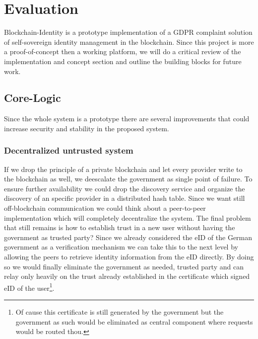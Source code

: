 \chapter{Evaluation}
\label{cha:evaluation}

Blockchain-Identity is a prototype implementation of a GDPR complaint solution of self-sovereign identity management in the blockchain. Since this project is more a proof-of-concept then a working platform, we will do a critical review of the implementation and concept section and outline the building blocks for future work.  

\section{Core-Logic}
\label{sec:coreLogicEval}
Since the whole system is a prototype there are several improvements that could increase security and stability in the proposed system. 

\subsection{Decentralized untrusted system}
\label{sec:untrustedSystem}
If we drop the principle of a private blockchain and let every provider write to the blockchain as well, we deescalate the government as single point of failure. To ensure further availability we could drop the discovery service and organize the discovery of an specific provider in a distributed hash table. Since we want still off-blockchain communication we could think about a peer-to-peer implementation which will completely decentralize the system. The final problem that still remains is how to establish trust in a new user without having the government as trusted party? Since we already considered the eID of the German government as a verification mechanism we can take this to the next level by allowing the peers to retrieve identity information from the eID directly. By doing so we would finally eliminate the government as needed, trusted party and can relay only heavily on the trust already established in the certificate which signed eID of the user\footnote{Of cause this certificate is still generated by the government but the government as such would be eliminated as central component where requests would be routed thou.}.

